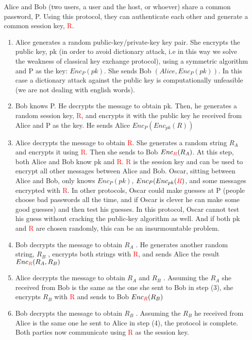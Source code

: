 \documentclass{article}
\begin{document}
Alice and Bob (two users, a user and the host, or whoever) share a common
password, P. Using this protocol, they can authenticate each other and generate
a common session key, \textcolor{red}{R}.
\begin{enumerate}
    \item Alice generates a random public-key/private-key key pair. She
encrypts the public key, pk (in order to avoid dictionary attack, i.e in this way we solve the weakness of classical key exchange protocol), using a symmetric algorithm and P as the
key: $Enc_P(pk)$. She sends Bob $(Alice, Enc_P(pk))$. In this case a dictionary attack against the public key is computationally unfeasible (we are not dealing with english words).
    \item Bob knows P. He decrypts the message to obtain pk. Then, he
generates a random session key, \textcolor{red}{R}, and encrypts it with the public key
he received from Alice and P as the key. He sends Alice $Enc_P(Enc_{pk}(R))$
    \item Alice decrypts the message to obtain \textcolor{red}{R}. She generates a random string $R_A$ and encrypts it using \textcolor{red}{R}. Then she sends to Bob $Enc_{\textcolor{red}{R}}(R_A)$. At this step, both Alice and Bob know pk  and  \textcolor{red}{R}.  \textcolor{red}{R} is the session key and can
be used to encrypt all other messages between Alice and Bob. Oscar, sitting
between Alice and Bob, only knows $Enc_P(pk)$, $Enc_P(Enc_{pk}( \textcolor{red}{R})$, and some messages
encrypted with  \textcolor{red}{R}. In other protocols, Oscar could make guesses at P (people
choose bad passwords all the time, and if Oscar is clever he can make some
good guesses) and then test his guesses. In this protocol, Oscar cannot test his guess without cracking the public-key algorithm as well. And if both pk and  \textcolor{red}{R} are chosen randomly, this can be an insurmountable problem.
\item Bob decrypts the message to obtain $R_A$ . He generates another
random string, $R_B$ , encrypts both strings with \textcolor{red}{R}, and sends Alice the
result $Enc_{\textcolor{red}{R}}(R_A, R_B)$
\item Alice decrypts the message to obtain $R_A$ and $R_B$ . Assuming the $R_A$
she received from Bob is the same as the one she sent to Bob in step (3),
she encrypts $R_B$ with \textcolor{red}{R} and sends to Bob $Enc_{\textcolor{red}{R}}(R_B)$
\item Bob decrypts the message to obtain $R_B$ . Assuming the $R_B$ he
received from Alice is the same one he sent to Alice in step (4), the protocol is complete. Both parties now communicate using \textcolor{red}{R} as the
session key.
\end{enumerate}
\end{document}
